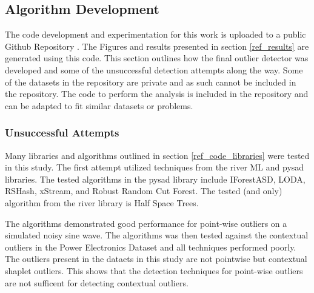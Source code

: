 \subsection{Algorithm Development}

The code development and experimentation for this work is uploaded to a public Github Repository \parencite{BeattieGithub2022}. The Figures and results presented in section \ref{ref_results} are generated using this code. This section outlines how the final outlier detector was developed and some of the unsuccessful detection attempts along the way. Some of the datasets in the repository are private and as such cannot be included in the repository. The code to perform the analysis is included in the repository and can be adapted to fit similar datasets or problems.


\subsubsection{Unsuccessful Attempts}

Many libraries and algorithms outlined in section \ref{ref_code_libraries} were tested in this study. The first attempt utilized techniques from the river ML \parencite{2020river} and pysad \parencite{pysad} libraries.  The tested algorithms in the pysad library include IForestASD, LODA, RSHash, xStream, and Robust Random Cut Forest. The tested (and only) algorithm from the river library is Half Space Trees.

The algorithms demonstrated good performance for point-wise outliers on a simulated noisy sine wave. The algorithms was then tested against the contextual outliers in the Power Electronics Dataset and all techniques performed poorly. The outliers present in the dataets in this study are not pointwise but contextual shaplet outliers. This shows that the detection techniques for point-wise outliers are not sufficent for detecting contextual outliers.

